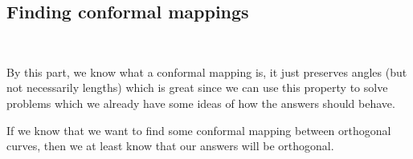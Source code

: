 \subsection{Finding conformal mappings}\hfill\\\par
\noindent By this part, we know what a conformal mapping is, it just preserves angles (but not necessarily lengths) which is great since we can use this property to solve problems which we already have some ideas of how the answers should behave.\par
\noindent If we know that we want to find some conformal mapping between orthogonal curves, then we at least know that our answers will be orthogonal.
